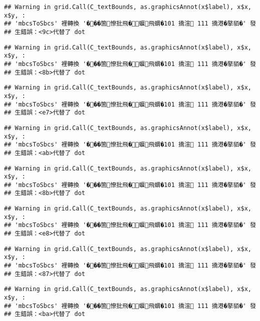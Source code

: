 \documentclass[
]{article}
\begin{document}
\begin{verbatim}
## Warning in grid.Call(C_textBounds, as.graphicsAnnot(x$label), x$x, x$y, :
## 'mbcsToSbcs' 裡轉換 '���箇憭批飛�蝘飛蝟�101 撟渲 111 撟港�摮貊�' 發
## 生錯誤：<9c>代替了 dot
\end{verbatim}

\begin{verbatim}
## Warning in grid.Call(C_textBounds, as.graphicsAnnot(x$label), x$x, x$y, :
## 'mbcsToSbcs' 裡轉換 '���箇憭批飛�蝘飛蝟�101 撟渲 111 撟港�摮貊�' 發
## 生錯誤：<8b>代替了 dot
\end{verbatim}

\begin{verbatim}
## Warning in grid.Call(C_textBounds, as.graphicsAnnot(x$label), x$x, x$y, :
## 'mbcsToSbcs' 裡轉換 '���箇憭批飛�蝘飛蝟�101 撟渲 111 撟港�摮貊�' 發
## 生錯誤：<e7>代替了 dot
\end{verbatim}

\begin{verbatim}
## Warning in grid.Call(C_textBounds, as.graphicsAnnot(x$label), x$x, x$y, :
## 'mbcsToSbcs' 裡轉換 '���箇憭批飛�蝘飛蝟�101 撟渲 111 撟港�摮貊�' 發
## 生錯誤：<ab>代替了 dot
\end{verbatim}

\begin{verbatim}
## Warning in grid.Call(C_textBounds, as.graphicsAnnot(x$label), x$x, x$y, :
## 'mbcsToSbcs' 裡轉換 '���箇憭批飛�蝘飛蝟�101 撟渲 111 撟港�摮貊�' 發
## 生錯誤：<8b>代替了 dot
\end{verbatim}

\begin{verbatim}
## Warning in grid.Call(C_textBounds, as.graphicsAnnot(x$label), x$x, x$y, :
## 'mbcsToSbcs' 裡轉換 '���箇憭批飛�蝘飛蝟�101 撟渲 111 撟港�摮貊�' 發
## 生錯誤：<e8>代替了 dot
\end{verbatim}

\begin{verbatim}
## Warning in grid.Call(C_textBounds, as.graphicsAnnot(x$label), x$x, x$y, :
## 'mbcsToSbcs' 裡轉換 '���箇憭批飛�蝘飛蝟�101 撟渲 111 撟港�摮貊�' 發
## 生錯誤：<87>代替了 dot
\end{verbatim}

\begin{verbatim}
## Warning in grid.Call(C_textBounds, as.graphicsAnnot(x$label), x$x, x$y, :
## 'mbcsToSbcs' 裡轉換 '���箇憭批飛�蝘飛蝟�101 撟渲 111 撟港�摮貊�' 發
## 生錯誤：<ba>代替了 dot
\end{verbatim}
\end{document}
